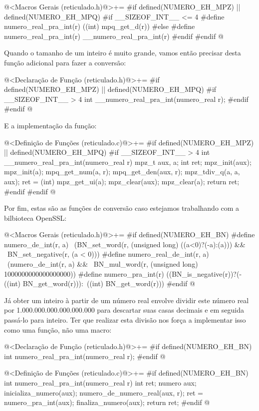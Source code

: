 \iniciocodigo
@<Macros Gerais (reticulado.h)@>+=
#if defined(NUMERO_EH_MPZ) || defined(NUMERO_EH_MPQ)
#if __SIZEOF_INT__ <= 4
#define numero_real_pra_int(r) ((int) mpq_get_d(r))
#else
#define numero_real_pra_int(r) __numero_real_pra_int(r)
#endif
#endif
@
\fimcodigo

Quando o tamanho de um inteiro é muito grande, vamos então precisar
desta função adicional para fazer a conversão:

\iniciocodigo
@<Declaração de Função (reticulado.h)@>+=
#if defined(NUMERO_EH_MPZ) || defined(NUMERO_EH_MPQ)
#if __SIZEOF_INT__ > 4
int __numero_real_pra_int(numero_real r);
#endif
#endif
@
\fimcodigo

E a implementação da função:

\iniciocodigo
@<Definição de Funções (reticulado.c)@>+=
#if defined(NUMERO_EH_MPZ) || defined(NUMERO_EH_MPQ)
#if __SIZEOF_INT__ > 4
int __numero_real_pra_int(numero_real r){
  mpz_t aux, a;
  int ret;
  mpz_init(aux);
  mpz_init(a);
  mpq_get_num(a, r);
  mpq_get_den(aux, r);
  mpz_tdiv_q(a, a, aux);
  ret = (int) mpz_get_ui(a);
  mpz_clear(aux);
  mpz_clear(a);
  return ret;
}
#endif
#endif
@
\fimcodigo

Por fim, estas são as funções de conversão caso estejamos trabalhando
com a bilbioteca OpenSSL:

\iniciocodigo
@<Macros Gerais (reticulado.h)@>+=
#if defined(NUMERO_EH_BN)
#define numero_de_int(r, a)                                     \
          (BN_set_word(r, (unsigned long) ((a<0)?(-a):(a))) &&  \
           BN_set_negative(r, (a < 0)))
#define numero_real_de_int(r, a)   \
          (numero_de_int(r, a) &&  \
           BN_mul_word(r, (unsigned long) 1000000000000000000))
#define numero_pra_int(r) ((BN_is_negative(r))?(-((int) BN_get_word(r))):\
                                              ((int) BN_get_word(r)))
#endif
@
\fimcodigo

Já obter um inteiro à partir de um número real envolve dividir este
número real por 1.000.000.000.000.000.000 para descartar suas casas
decimais e em seguida passá-lo para inteiro. Ter que realizar esta
divisão nos força a implementar isso como uma função, não uma macro:

\iniciocodigo
@<Declaração de Função (reticulado.h)@>+=
#if defined(NUMERO_EH_BN)
int numero_real_pra_int(numero_real r);
#endif
@
\fimcodigo

\iniciocodigo
@<Definição de Funções (reticulado.c)@>+=
#if defined(NUMERO_EH_BN)
int numero_real_pra_int(numero_real r){
  int ret;
  numero aux;
  inicializa_numero(aux);
  numero_de_numero_real(aux, r);
  ret = numero_pra_int(aux);
  finaliza_numero(aux);
  return ret;
}
#endif
@
\fimcodigo

